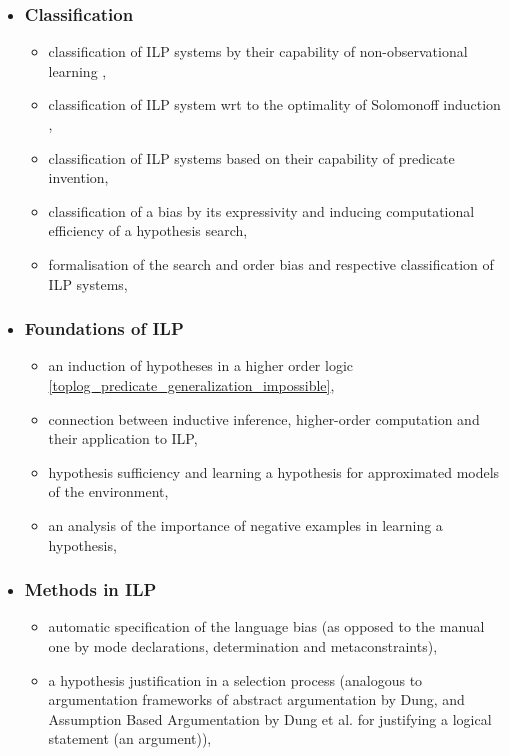 \begin{itemize}
\item \subsubsection{Classification}
\begin{itemize}
\item classification of ILP systems by their capability of non-observational learning \cite{kimber2012learning},
\item classification of ILP system wrt to the optimality of Solomonoff induction \cite{solomonoff1964formal},
\item classification of ILP systems based on their capability of predicate invention,
\item classification of a bias by its expressivity and inducing computational efficiency of a hypothesis search,
\item formalisation of the search and order bias and respective classification of ILP systems,
\end{itemize}
\item \subsubsection{Foundations of ILP}
\begin{itemize}
\item an induction of hypotheses in a higher order logic \ref{toplog_predicate_generalization_impossible},
\item connection between inductive inference, higher-order computation \cite{longley2000notions} and their application to ILP,
\item hypothesis sufficiency and learning a hypothesis for approximated models of the environment,
\item an analysis of the importance of negative examples in learning a hypothesis,
\end{itemize}
\item \subsubsection{Methods in ILP}
\begin{itemize}
\item automatic specification of the language bias (as opposed to the manual one by mode declarations, determination and metaconstraints),
\item a hypothesis justification in a selection process (analogous to argumentation frameworks of abstract argumentation by Dung\cite{dung1995acceptability}, and Assumption Based Argumentation by Dung et al.\cite{dung2009assumption} for justifying a logical statement (an argument)),
\end{itemize}
\end{itemize}
